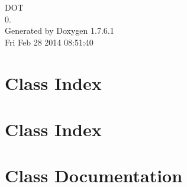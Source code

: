 \documentclass[a4paper]{book}
\begin{document}
\hypersetup{pageanchor=false,citecolor=blue}
\begin{titlepage}
\vspace*{7cm}
\begin{center}
{\Large \-D\-O\-T \\[1ex]\large 0. }\\
\vspace*{1cm}
{\large \-Generated by Doxygen 1.7.6.1}\\
\vspace*{0.5cm}
{\small Fri Feb 28 2014 08:51:40}\\
\end{center}
\end{titlepage}
\clearemptydoublepage
{}
\tableofcontents
\clearemptydoublepage
{}
\hypersetup{pageanchor=true,citecolor=blue}
\chapter{\-Class \-Index}

\chapter{\-Class \-Index}

\chapter{\-Class \-Documentation}


































\printindex
\end{document}
